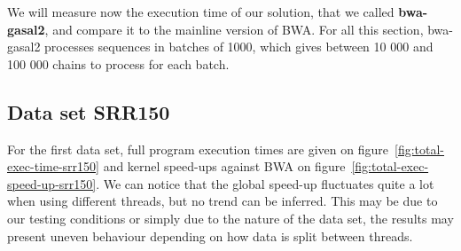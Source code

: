 We will measure now the execution time of our solution, that we called \textbf{bwa-gasal2}, and compare it to the mainline version of BWA. For all this section, bwa-gasal2 processes sequences in batches of 1000, which gives between 10 000 and 100 000 chains to process for each batch.

\subsection{Data set SRR150}

For the first data set, full program execution times are given on figure~\ref{fig:total-exec-time-srr150} and kernel speed-ups against BWA on figure~\ref{fig:total-exec-speed-up-srr150}. We can notice that the global speed-up fluctuates quite a lot when using different threads, but no trend can be inferred. This may be due to our testing conditions or simply due to the nature of the data set, the results may present uneven behaviour depending on how data is split between threads.

